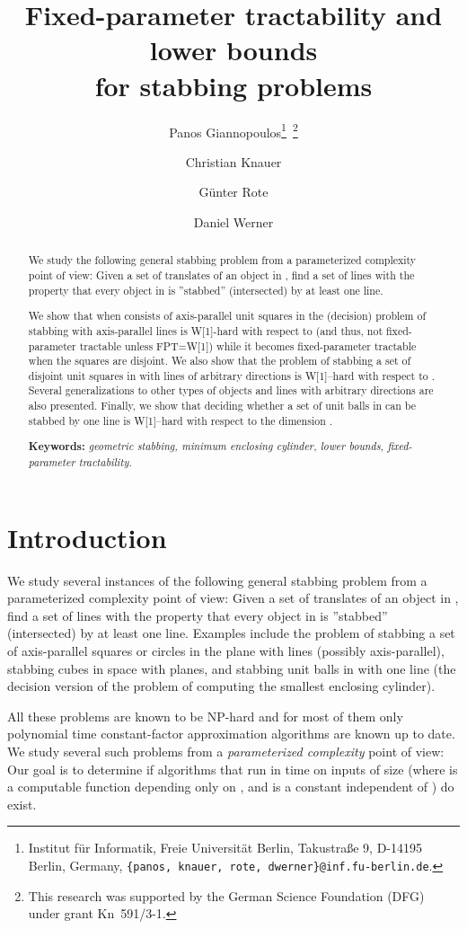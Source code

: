 \documentclass[12pt]{article}
\title{Fixed-parameter tractability and lower bounds\\ for stabbing problems}
\author{ Panos Giannopoulos\thanks{Institut f{\"ur} Informatik, Freie Universit{\"a}t Berlin,
    Takustra{\ss}e 9, D-14195 Berlin, Germany, {\tt\{panos, knauer, rote,
    dwerner\}@inf.fu-berlin.de}.}{\ }\footnote{This research was
    supported by the German Science Foundation (DFG) under grant Kn~591/3-1.}
\and
Christian Knauer\footnotemark[1]{\ }\footnotemark[2]
\and
G{\"u}nter Rote\footnotemark[1]
\and
Daniel Werner\footnotemark[1]
}
\begin{document}
\maketitle

\begin{abstract}
We study the following general stabbing problem from
a parameterized complexity point of view: Given a set  of  translates of an
object in , find a set of  lines with the property that every
object in  is ''stabbed'' (intersected) by at least one line.

We show that when  consists of axis-parallel unit squares in  the (decision) problem of stabbing  with
axis-parallel lines is W[1]-hard with respect to  (and thus, not fixed-parameter tractable
unless FPT=W[1]) while it becomes fixed-parameter tractable when the squares are disjoint.  
We also show that the problem of stabbing a set of disjoint unit squares in  with lines of arbitrary directions is 
W[1]--hard with respect to .  
Several generalizations to other types of objects and lines with arbitrary directions are also presented. 
Finally, we show that deciding whether a set of unit balls in  can be stabbed by one line is W[1]--hard with respect to 
the dimension . 

\noindent
  \textbf{Keywords:} \emph{geometric stabbing, minimum enclosing cylinder, 
         lower bounds, fixed-parameter tractability.} 
\end{abstract}





\section{Introduction}
We study several instances of the following general stabbing problem from
a parameterized complexity point of view: Given a set  of  translates of an
object in , find a set of  lines with the property that every
object in  is ''stabbed'' (intersected) by at least one line. 
Examples include the problem of stabbing a set of axis-parallel squares or circles in
the plane with  lines (possibly axis-parallel), stabbing cubes in space
with  planes, and stabbing unit balls in  with one line (the
decision version of the problem of computing the smallest enclosing
cylinder).

All these problems are known to be NP-hard and for most of them only 
polynomial time constant-factor approximation algorithms are known up to date.
We study several such problems from a \emph{parameterized complexity} point of
view: Our goal is to determine if algorithms that run in  time on inputs of size  (where  is a computable function
depending only on , and  is a constant independent of ) do
exist.
\end{document}
